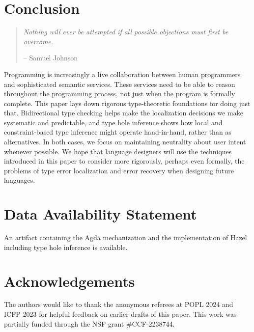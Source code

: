 \section{Conclusion}
\label{sec:conclusion}

\begin{quote}
    \emph{Nothing will ever be attempted if all possible objections must first be overcome.} 
    \begin{flushright}-- Samuel Johnson\end{flushright}
\end{quote}

Programming is increasingly a live collaboration between human programmers and sophisticated semantic services. These services need to be able to reason throughout the programming process, not just when the program is formally complete. This paper lays down rigorous type-theoretic foundations for doing just that. Bidirectional type checking helps make the localization decisions we make systematic and predictable, and type hole inference shows how local and constraint-based type inference might operate hand-in-hand, rather than as alternatives. In both cases, we focus on maintaining neutrality about user intent whenever possible. 
We hope that language designers will use the techniques introduced in this paper to consider more rigorously, perhaps even formally, the problems of type error localization and error recovery when designing future languages. 

\section*{Data Availability Statement}
An artifact \cite{zhao2023} containing the Agda mechanization and the implementation of Hazel
including type hole inference is available.

\section*{Acknowledgements}
The authors would like to thank the anonymous referees at POPL 2024 and ICFP 2023 for helpful feedback on earlier drafts of this paper.
This work was partially funded through the NSF grant \#CCF-2238744.

